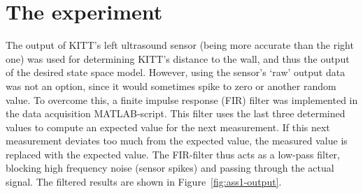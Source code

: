 \documentclass[11pt,titlepage]{report}
\begin{document}
\section{The experiment}
The output of KITT's left ultrasound sensor (being more accurate than the right one) was used for determining KITT's distance to the wall, and thus the output of the desired state space model. However, using the sensor's `raw' output data was not an option, since it would sometimes spike to zero or another random value. To overcome this, a finite impulse response (FIR) filter was implemented in the data acquisition MATLAB-script. This filter uses the last three determined values to compute an expected value for the next measurement. If this next measurement deviates too much from the expected value, the measured value is replaced with the expected value. The FIR-filter thus acts as a low-pass filter, blocking high frequency noise (sensor spikes) and passing through the actual signal.
The filtered results are shown in Figure~\ref{fig:ass1-output}.
\end{document}
